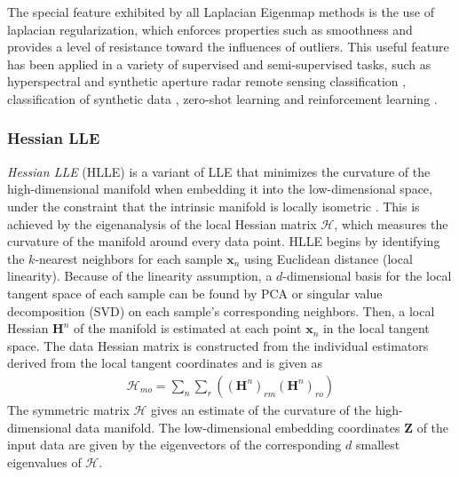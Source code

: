 The special feature exhibited by all Laplacian Eigenmap methods is the use of laplacian regularization, which enforces properties such as smoothness and provides a level of resistance toward the influences of outliers.  This useful feature has been applied in a variety of supervised and semi-supervised tasks, such as hyperspectral and synthetic aperture radar remote sensing classification \citep{Ratle2010ManRegHSI, Ren2017ManRegSAR}, classification of synthetic data \citep{Tsang2007ManifoldRegularization}, zero-shot learning \citep{Meng2018ManRegZeroShot} and reinforcement learning \citep{Li2015ManRegReinforcementLearning}.

\subsubsection{Hessian LLE} \label{sec:Hessian_LLE}
\textit{Hessian LLE} (HLLE) \citep{Donoho2003HessianEigenmaps} is a variant of LLE that minimizes the curvature of the high-dimensional manifold when embedding it into the low-dimensional space, under the constraint that the intrinsic manifold is locally isometric \citep{VanDerMaaten2009DRReview,Thorstensen2009ManifoldThesis}.  This is achieved by the eigenanalysis of the local Hessian matrix $\mathcal{H}$, which measures the curvature of the manifold around every data point.  HLLE begins by identifying the $k$-nearest neighbors for each sample $\bm{x}_{n}$ using Euclidean distance (local linearity).  Because of the linearity assumption, a $d$-dimensional basis for the local tangent space of each sample can be found by PCA or singular value decomposition (SVD) on each sample's corresponding neighbors.   Then, a local Hessian $\bm{H}^{n}$ of the manifold is estimated at each point $\bm{x}_{n}$ in the local tangent space.  The data Hessian matrix is constructed from the individual estimators derived from the local tangent coordinates and is given as
\begin{align}
	\mathcal{H}_{mo} = \sum_{n}\sum_{r}((\bm{H}^{n})_{rm}(\bm{H}^{n})_{ro})
\end{align}
The symmetric matrix $\mathcal{H}$ gives an estimate of the curvature of the high-dimensional data manifold.  The low-dimensional embedding coordinates $\bm{Z}$ of the input data are given by the eigenvectors of the corresponding $d$ smallest eigenvalues of $\mathcal{H}$.


